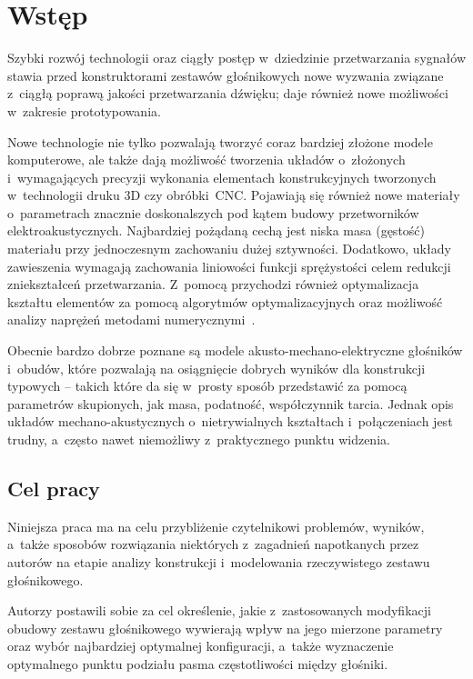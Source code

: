 \documentclass[12pt]{oska}
\affiliation{Akademia Górniczo-Hutnicza im. S. Staszica w Krakowie}
\begin{document}
\maketitles

\section{Wstęp}

	Szybki rozwój technologii oraz ciągły postęp w~dziedzinie przetwarzania sygnałów stawia przed konstruktorami zestawów głośnikowych nowe wyzwania związane z~ciągłą poprawą jakości przetwarzania dźwięku; daje również nowe możliwości w~zakresie prototypowania. 

	Nowe technologie nie tylko pozwalają tworzyć coraz bardziej złożone modele komputerowe, ale także dają możliwość tworzenia układów o~złożonych i~wymagających precyzji wykonania elementach konstrukcyjnych tworzonych w~technologii druku 3D czy obróbki~CNC. Pojawiają się również nowe materiały o~parametrach znacznie doskonalszych pod kątem budowy przetworników elektroakustycznych. Najbardziej pożądaną cechą jest niska masa (gęstość) materiału przy jednoczesnym zachowaniu dużej sztywności. Dodatkowo, układy zawieszenia wymagają zachowania liniowości funkcji sprężystości celem redukcji zniekształceń przetwarzania. Z~pomocą przychodzi również optymalizacja kształtu elementów za pomocą algorytmów optymalizacyjnych oraz możliwość analizy naprężeń metodami numerycznymi~\cite{naprezenia}.

	Obecnie bardzo dobrze poznane są modele akusto-mechano-elektryczne głośników i~obudów, które pozwalają na osiągnięcie dobrych wyników dla konstrukcji typowych -- takich które da się w~prosty sposób przedstawić za pomocą parametrów skupionych, jak masa, podatność, współczynnik tarcia. Jednak opis układów mechano-akustycznych o~nietrywialnych kształtach i~połączeniach jest trudny, a~często nawet niemożliwy z~praktycznego punktu widzenia.

	\subsection{Cel pracy}

		Niniejsza praca ma na celu przybliżenie czytelnikowi problemów, wyników, a~także sposobów rozwiązania niektórych z~zagadnień napotkanych przez autorów na etapie analizy konstrukcji i~modelowania rzeczywistego zestawu głośnikowego.
		
		Autorzy postawili sobie za cel określenie, jakie z~zastosowanych modyfikacji obudowy zestawu głośnikowego wywierają wpływ na jego mierzone parametry oraz wybór najbardziej optymalnej konfiguracji, a~także wyznaczenie optymalnego punktu podziału pasma częstotliwości między głośniki.
		
\end{document}
